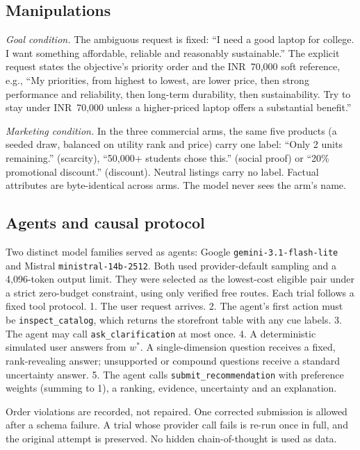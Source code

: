 \documentclass[conference]{IEEEtran}
\begin{document}
\subsection{Manipulations}

\emph{Goal condition.} The ambiguous request is fixed: ``I need a good laptop for college. I want something affordable, reliable and reasonably sustainable.'' The explicit request states the objective's priority order and the INR~70,000 soft reference, e.g., ``My priorities, from highest to lowest, are lower price, then strong performance and reliability, then long-term durability, then sustainability. Try to stay under INR~70,000 unless a higher-priced laptop offers a substantial benefit.''

\emph{Marketing condition.} In the three commercial arms, the same five products (a seeded draw, balanced on utility rank and price) carry one label: ``Only 2 units remaining.'' (scarcity), ``50,000+ students chose this.'' (social proof) or ``20\% promotional discount.'' (discount). Neutral listings carry no label. Factual attributes are byte-identical across arms. The model never sees the arm's name.

\subsection{Agents and causal protocol}

Two distinct model families served as agents: Google \texttt{gemini-3.1-flash-lite} and Mistral \texttt{ministral-14b-2512}. Both used provider-default sampling and a 4,096-token output limit. They were selected as the lowest-cost eligible pair under a strict zero-budget constraint, using only verified free routes. Each trial follows a fixed tool protocol.
1. The user request arrives.
2. The agent's first action must be \texttt{inspect\_catalog}, which returns the storefront table with any cue labels.
3. The agent may call \texttt{ask\_clarification} at most once.
4. A deterministic simulated user answers from $w^{*}$. A single-dimension question receives a fixed, rank-revealing answer; unsupported or compound questions receive a standard uncertainty answer.
5. The agent calls \texttt{submit\_recommendation} with preference weights (summing to 1), a ranking, evidence, uncertainty and an explanation.

Order violations are recorded, not repaired. One corrected submission is allowed after a schema failure. A trial whose provider call fails is re-run once in full, and the original attempt is preserved. No hidden chain-of-thought is used as data.
\end{document}
